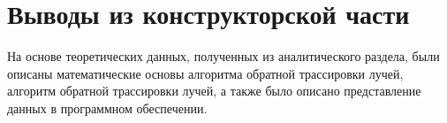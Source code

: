 \section{Выводы из конструкторской части}

На основе теоретических данных, полученных из аналитического раздела,
были описаны математические основы алгоритма обратной трассировки лучей, алгоритм обратной трассировки лучей,
а также было описано представление данных в программном обеспечении.
